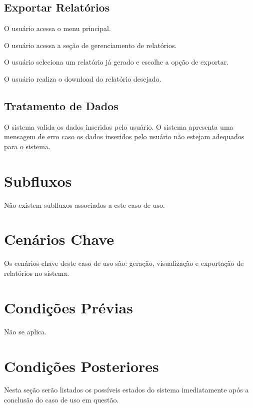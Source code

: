 \documentclass[12pt,a4paper]{article}
\begin{document}
\subsection{Exportar Relatórios}

\begin{fluxo}
  \item O usuário acessa o menu principal.
  \item O usuário acessa a seção de gerenciamento de relatórios.
  \item O usuário seleciona um relatório já gerado e escolhe a opção de
        exportar.
  \item O usuário realiza o download do relatório desejado.
\end{fluxo}

\subsection{Tratamento de Dados}

O sistema valida os dados inseridos pelo usuário. O sistema apresenta uma
mensagem de erro caso os dados inseridos pelo usuário não estejam adequados
para o sistema.

\section{Subfluxos}

Não existem subfluxos associados a este caso de uso.

\section{Cenários Chave}

Os cenários-chave deste caso de uso são: geração, visualização e exportação de
relatórios no sistema.

\section{Condições Prévias}

Não se aplica.

\section{Condições Posteriores}

Nesta seção serão listados os possíveis estados do sistema imediatamente após
a conclusão do caso de uso em questão.
\end{document}
